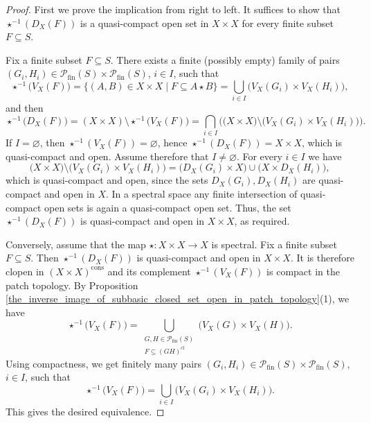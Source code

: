 \documentclass[10pt, reqno]{amsart}
\theoremstyle{plain}
\theoremstyle{definition}
\begin{document}
\begin{proof}
    First we prove the implication from right to left. It suffices to show that $\star^{-1}(D_X(F))$ is a quasi-compact open set in $X \times X$ for every finite subset $F \subseteq S$. 
    
    Fix a finite subset $F \subseteq S$. There exists a finite (possibly empty) family of pairs $(G_i, H_i)\in\mathcal{P}_\mathrm{fin}(S) \times \mathcal{P}_\mathrm{fin}(S)$, $i \in I$, such that $$\star^{-1}\big(V_X(F)\big) = \{(A, B) \in X \times X \mid F \subseteq A \star B\} = \bigcup_{i \in I} \big(V_X(G_i) \times V_X(H_i)\big),$$ and then $$\star^{-1}\big(D_X(F)\big) = (X \times X)\setminus\star^{-1}\big(V_X(F)\big) = \bigcap_{i \in I} \Big(\big(X \times X\big) \setminus \big(V_X(G_i) \times V_X(H_i)\big)\Big).$$ If $I=\varnothing$, then $\star^{-1}(V_X(F)) = \varnothing$, hence $\star^{-1}(D_X(F)) = X\times X$, which is quasi-compact and open. Assume therefore that $I \neq \varnothing$. For every $i\in I$ we have $$\big(X \times X)\setminus\big(V_X(G_i) \times V_X(H_i)\big) = \big(D_X(G_i) \times X\big) \cup \big(X \times D_X(H_i)\big),$$
    which is quasi-compact and open, since the sets $D_X(G_i), D_X(H_i)$ are quasi-compact and open in $X$. In a spectral space any finite intersection of quasi-compact open sets is again a quasi-compact open set. Thus, the set $\star^{-1}(D_X(F))$ is quasi-compact and open in $X \times X$, as required.  
    
    Conversely, assume that the map $\star: X \times X \to X$ is spectral. Fix a finite subset $F \subseteq S$. Then $\star^{-1}(D_X(F))$ is quasi-compact and open in $X \times X$. It is therefore clopen in $(X \times X)^\mathrm{cons}$ and its complement $\star^{-1}(V_X(F))$ is compact in the patch topology. By Proposition \ref{the_inverse_image_of_subbasic_closed_set_open_in_patch_topology}(1), we have $$\star^{-1}\big(V_X(F)\big) = \bigcup_{\substack{G, H\in\mathcal{P}_\mathrm{fin}(S) \\ F \subseteq (GH)^\mathrm{cl}}}\big(V_X(G) \times V_X(H)\big).$$ Using compactness, we get finitely many pairs $(G_i, H_i)\in\mathcal{P}_\mathrm{fin}(S)\times\mathcal{P}_\mathrm{fin}(S)$, $i\in I$, such that $$\star^{-1}\big(V_X(F)\big) = \bigcup_{i\in I} \big(V_X(G_i) \times V_X(H_i)\big).$$ This gives the desired equivalence.  
\end{proof}
\end{document}
